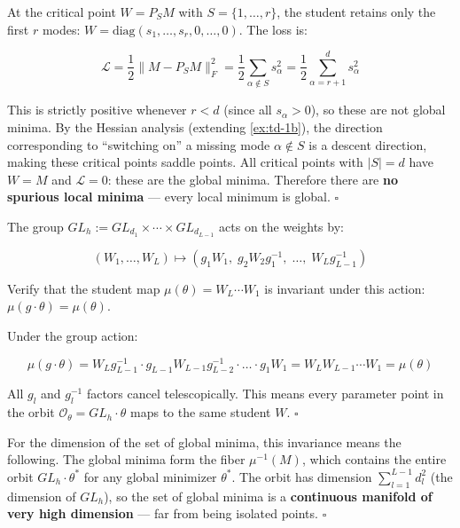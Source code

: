 \documentclass[11pt]{article}
\begin{document}
\begin{solution}[ex:td-1c]
At the critical point \(W = P_S M\) with
\(S = \{1, \ldots, r\}\), the student retains only the first \(r\)
modes: \(W = \text{diag}(s_1, \ldots, s_r, 0, \ldots, 0)\). The loss is:

\[\mathcal{L} = \frac{1}{2}\|M - P_S M\|_F^2 = \frac{1}{2}\sum_{\alpha \notin S} s_\alpha^2 = \frac{1}{2}\sum_{\alpha=r+1}^d s_\alpha^2\]

This is strictly positive whenever \(r < d\) (since all
\(s_\alpha > 0\)), so these are not global minima. By the Hessian
analysis (extending \cref{ex:td-1b}), the direction corresponding to
``switching on'' a missing mode \(\alpha \notin S\) is a descent
direction, making these critical points saddle points. All critical
points with \(|S| = d\) have \(W = M\) and \(\mathcal{L} = 0\): these
are the global minima. Therefore there are \textbf{no spurious local
minima} --- every local minimum is global. \(\square\)
\end{solution}

\begin{exercise}
\label{ex:td-1d}
The group
\(GL_h := GL_{d_1} \times \cdots \times GL_{d_{L-1}}\) acts on the
weights by:

\[(W_1, \ldots, W_L) \mapsto (g_1 W_1,\; g_2 W_2 g_1^{-1},\; \ldots,\; W_L g_{L-1}^{-1})\]

Verify that the student map \(\mu(\theta) = W_L \cdots W_1\) is
invariant under this action: \(\mu(g \cdot \theta) = \mu(\theta)\).
\end{exercise}

\begin{solution}[ex:td-1d]
Under the group action:

\[\mu(g \cdot \theta) = W_L g_{L-1}^{-1} \cdot g_{L-1} W_{L-1} g_{L-2}^{-1} \cdot \ldots \cdot g_1 W_1 = W_L W_{L-1} \cdots W_1 = \mu(\theta)\]

All \(g_l\) and \(g_l^{-1}\) factors cancel telescopically. This means
every parameter point in the orbit
\(\mathcal{O}_\theta = GL_h \cdot \theta\) maps to the same student
\(W\). \(\square\)

For the dimension of the set of global minima,
this invariance means the following. The global minima form the fiber
\(\mu^{-1}(M)\), which contains
the entire orbit \(GL_h \cdot \theta^*\) for any global minimizer
\(\theta^*\). The orbit has dimension \(\sum_{l=1}^{L-1} d_l^2\) (the
dimension of \(GL_h\)), so the set of global minima is a
\textbf{continuous manifold of very high dimension} --- far from being
isolated points. \(\square\)
\end{solution}
\end{document}
